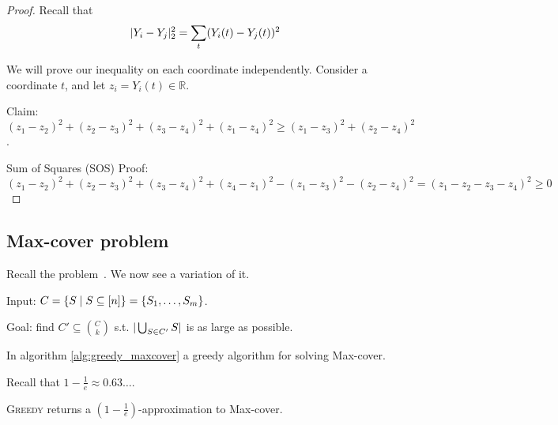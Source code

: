     \begin{proof}
        Recall that
        \[ \vert Y_i - Y_j \vert_2^2 = \sum_{t} (Y_i(t) - Y_j(t))^2 \]

        We will prove our inequality on each coordinate independently.
        Consider a coordinate $t$, and let $z_i = Y_i(t) \in \mathbb{R}$.

        Claim: $(z_1 - z_2)^2 + (z_2 - z_3)^2 + (z_3 - z_4)^2 + (z_1 - z_4)^2 \geq (z_1 - z_3)^2 + (z_2 - z_4)^2$.

        Sum of Squares (SOS) Proof:
        $(z_1 - z_2)^2 + (z_2 - z_3)^2 + (z_3 - z_4)^2 + (z_4 - z_1)^2 - (z_1 - z_3)^2 - (z_2 - z_4)^2 = (z_1 - z_2 - z_3 - z_4)^2 \geq 0$
    \end{proof}


\subsection{Max-cover problem}

    Recall the problem~.
    We now see a variation of it.

    Input: $C = \{ S \; \vert \; S \subseteq [n] \} = \{ S_1, \dots, S_m \}$.

    Goal: find $C' \subseteq \binom{C}{k}$ s.t. $\vert \bigcup_{S \in C'} S \vert$ is as large as possible.

    In algorithm \ref{alg:greedy_maxcover} a greedy algorithm for solving Max-cover.

    

    Recall that $1 - \frac{1}{e} \approx 0.63\dots$.

    \begin{theorem}
        \textsc{Greedy} returns a $(1 - \frac{1}{e})$-approximation to Max-cover.
    \end{theorem}

